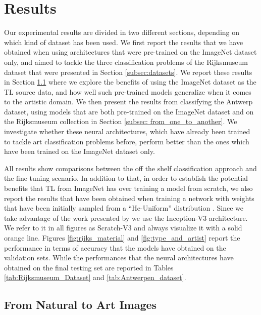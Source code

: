 
\section{Results}
\label{sec:results}

Our experimental results are divided in two different sections, depending on which kind of dataset has been used. We first report the results that we have obtained when using architectures that were pre-trained on the ImageNet dataset only, and aimed to tackle the three classification problems of the Rijksmuseum dataset that were presented in Section \ref{subsec:datasets}. We report these results in Section \ref{subsec: natural_to_art} where we explore the benefits of using the ImageNet dataset as the TL source data, and how well such pre-trained models generalize when it comes to the artistic domain. We then present the results from classifying the Antwerp dataset, using models that are both pre-trained on the ImageNet dataset and on the Rijksmuseum collection in Section \ref{subsec: from_one_to_another}. We investigate whether these neural architectures, which have already been trained to tackle art classification problems before, perform better than the ones which have been trained on the ImageNet dataset only.    

All results show comparisons between the off the shelf classification approach and the fine tuning scenario. In addition to that, in order to establish the potential benefits that TL from ImageNet has over training a model from scratch, we also report the results that have been obtained when training a network with weights that have been initially sampled from a ``He-Uniform'' distribution \cite{he2015delving}. Since we take advantage of the work presented by \citet{bidoiadeep} we use the Inception-V3 architecture. We refer to it in all figures as Scratch-V3 and always visualize it with a solid orange line. Figures \ref{fig:rijks_material} and \ref{fig:type_and_artist} report the performance in terms of accuracy that the models have obtained on the validation sets. While the performances that the neural architectures have obtained on the final testing set are reported in Tables \ref{tab:Rijksmuseum_Dataset} and \ref{tab:Antwerpen_dataset}. 


\subsection{From Natural to Art Images}
\label{subsec: natural_to_art}

